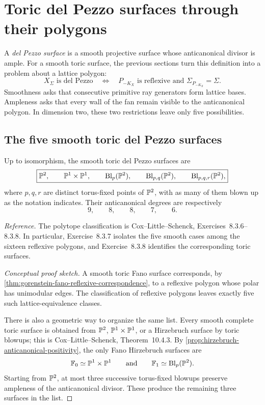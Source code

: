 \section{Toric del Pezzo surfaces through their polygons}
\label{sec:toric-del-pezzo-polygons}

A \emph{del Pezzo surface} is a smooth projective surface whose
anticanonical divisor is ample. For a smooth toric surface, the
previous sections turn this definition into a problem about a lattice
polygon:
\[
X_\Sigma\text{ is del Pezzo}
\quad\Longleftrightarrow\quad
P_{-K_X}\text{ is reflexive and }\Sigma_{P_{-K_X}}=\Sigma.
\]
Smoothness asks that consecutive primitive ray generators form lattice
bases. Ampleness asks that every wall of the fan remain visible to the
anticanonical polygon. In dimension two, these two restrictions leave
only five possibilities.

\subsection{The five smooth toric del Pezzo surfaces}

\begin{theorem}
\label{thm:classification-smooth-toric-del-pezzo}
Up to isomorphism, the smooth toric del Pezzo surfaces are
\[
\boxed{
\PP^2,
\qquad
\PP^1\times\PP^1,
\qquad
\Blp{\PP^2}{p},
\qquad
\Blp{\PP^2}{p,q},
\qquad
\Blp{\PP^2}{p,q,r},
}
\]
where \(p,q,r\) are distinct torus-fixed points of \(\PP^2\), with
as many of them blown up as the notation indicates.
Their anticanonical degrees are respectively
\[
9,\qquad 8,\qquad 8,\qquad 7,\qquad 6.
\]
\end{theorem}

\noindent
\textit{Reference.}
The polytope classification is Cox--Little--Schenck,
Exercises~8.3.6--8.3.8. In particular, Exercise~8.3.7 isolates the five
smooth cases among the sixteen reflexive polygons, and
Exercise~8.3.8 identifies the corresponding toric surfaces.

\begin{proof}[Conceptual proof sketch]
A smooth toric Fano surface corresponds, by
\cref{thm:gorenstein-fano-reflexive-correspondence}, to a reflexive
polygon whose polar has unimodular edges. The classification of
reflexive polygons leaves exactly five such lattice-equivalence
classes.

There is also a geometric way to organize the same list. Every smooth
complete toric surface is obtained from \(\PP^2\), \(\PP^1\times\PP^1\),
or a Hirzebruch surface by toric blowups; this is
Cox--Little--Schenck, Theorem~10.4.3. By
\cref{prop:hirzebruch-anticanonical-positivity}, the only Fano
Hirzebruch surfaces are
\[
\mathbb F_0\simeq\PP^1\times\PP^1
\qquad\text{and}\qquad
\mathbb F_1\simeq\Blp{\PP^2}{p}.
\]
Starting from \(\PP^2\), at most three successive torus-fixed blowups
preserve ampleness of the anticanonical divisor. These produce the
remaining three surfaces in the list.
\end{proof}

